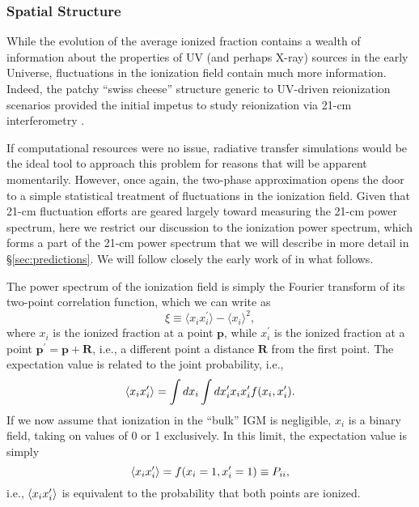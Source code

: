 \subsubsection{Spatial Structure} \label{sec:ionization_local}
While the evolution of the average ionized fraction contains a wealth of information about the properties of UV (and perhaps X-ray) sources in the early Universe, fluctuations in the ionization field contain much more information. Indeed, the patchy ``swiss cheese'' structure generic to UV-driven reionization scenarios provided the initial impetus to study reionization via 21-cm interferometry \cite{Madau1997}.

If computational resources were no issue, radiative transfer simulations would be the ideal tool to approach this problem for reasons that will be apparent momentarily. However, once again, the two-phase approximation opens the door to a simple statistical treatment of fluctuations in the ionization field. Given that 21-cm fluctuation efforts are geared largely toward measuring the 21-cm power spectrum, here we restrict our discussion to the ionization power spectrum, which forms a part of the 21-cm power spectrum that we will describe in more detail in \S\ref{sec:predictions}. We will follow closely the early work of \cite{Furlanetto2004} in what follows.

The power spectrum of the ionization field is simply the Fourier transform of its two-point correlation function, which we can write as
\begin{equation}
	\xi \equiv \langle x_i x_i^{\prime} \rangle - \langle x_i \rangle^2 ,
\end{equation}
where $x_i$ is the ionized fraction at a point $\mathbf{p}$, while $x_i^{\prime}$ is the ionized fraction at a point $\mathbf{p}^{\prime} = \mathbf{p} + \mathbf{R}$, i.e., a different point a distance $\mathbf{R}$ from the first point. The expectation value is related to the joint probability, i.e.,
\begin{equation}
	\langle x_i x_i^{\prime} \rangle = \int dx_i \int dx_i^{\prime} x_i x_i^{\prime} f(x_i, x_i^{\prime}) .
\end{equation}
If we now assume that ionization in the ``bulk'' IGM is negligible, $x_i$ is a binary field, taking on values of 0 or 1 exclusively. In this limit, the expectation value is simply
\begin{equation}
	\langle x_i x_i^{\prime} \rangle = f(x_i=1, x_i^{\prime}=1) \equiv P_{ii} ,
\end{equation}
i.e., $\langle x_i x_i^{\prime} \rangle$ is equivalent to the probability that both points are ionized. 

